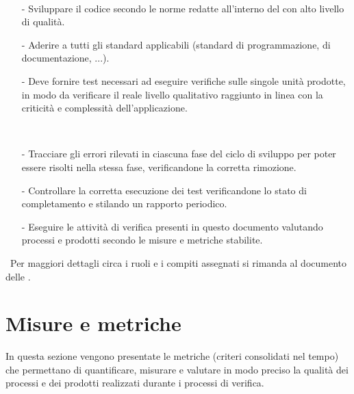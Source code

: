 \documentclass[a4paper, titlepage]{article}
\begin{document}
\begin{description}
\begin{itemize}
\end{itemize}
\ 
\item {}
\begin{itemize}
\item[-] Sviluppare il codice secondo le norme redatte all'interno del  con alto livello di qualità.
\item[-] Aderire a tutti gli standard applicabili (standard di programmazione, di documentazione, ...).
\item[-] Deve fornire test necessari ad eseguire verifiche sulle singole unità prodotte, in modo da verificare il reale livello
qualitativo raggiunto in linea con la criticità e complessità dell'applicazione.
\end{itemize}
\ 
\item {}
\begin{itemize}
\item[-] Tracciare gli errori rilevati in ciascuna fase del ciclo di sviluppo per poter essere risolti nella stessa fase, verificandone la corretta rimozione.
\item[-] Controllare la corretta esecuzione dei test verificandone lo stato di completamento e stilando un rapporto periodico. 
\item[-] Eseguire le attività di verifica presenti in questo documento valutando processi e prodotti secondo le misure e metriche stabilite.
\end{itemize}

\end{description}
\ 
\newline Per maggiori dettagli circa i ruoli e i compiti assegnati si rimanda al documento delle .

\newpage
\appendix
\section{Misure e metriche}
\label{sec:metr}
In questa sezione vengono presentate le metriche (criteri consolidati nel tempo) che permettano di quantificare, misurare e valutare in modo preciso la qualità dei processi e dei prodotti realizzati durante i processi di verifica.
\end{document}
